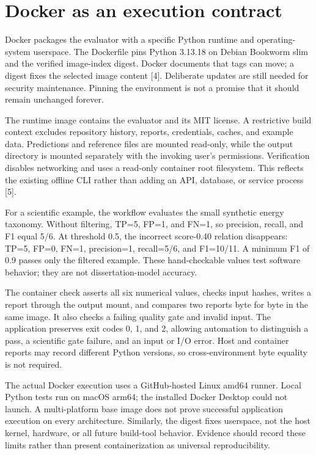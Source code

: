 \newpage
\section{Docker as an execution contract}
Docker packages the evaluator with a specific Python runtime and operating-system userspace. The Dockerfile pins Python 3.13.18 on Debian Bookworm slim and the verified image-index digest. Docker documents that tags can move; a digest fixes the selected image content [4]. Deliberate updates are still needed for security maintenance. Pinning the environment is not a promise that it should remain unchanged forever.

The runtime image contains the evaluator and its MIT license. A restrictive build context excludes repository history, reports, credentials, caches, and example data. Predictions and reference files are mounted read-only, while the output directory is mounted separately with the invoking user's permissions. Verification disables networking and uses a read-only container root filesystem. This reflects the existing offline CLI rather than adding an API, database, or service process [5].

For a scientific example, the workflow evaluates the small synthetic energy taxonomy. Without filtering, TP=5, FP=1, and FN=1, so precision, recall, and F1 equal 5/6. At threshold 0.5, the incorrect score-0.40 relation disappears: TP=5, FP=0, FN=1, precision=1, recall=5/6, and F1=10/11. A minimum F1 of 0.9 passes only the filtered example. These hand-checkable values test software behavior; they are not dissertation-model accuracy.

The container check asserts all six numerical values, checks input hashes, writes a report through the output mount, and compares two reports byte for byte in the same image. It also checks a failing quality gate and invalid input. The application preserves exit codes 0, 1, and 2, allowing automation to distinguish a pass, a scientific gate failure, and an input or I/O error. Host and container reports may record different Python versions, so cross-environment byte equality is not required.

The actual Docker execution uses a GitHub-hosted Linux amd64 runner. Local Python tests run on macOS arm64; the installed Docker Desktop could not launch. A multi-platform base image does not prove successful application execution on every architecture. Similarly, the digest fixes userspace, not the host kernel, hardware, or all future build-tool behavior. Evidence should record these limits rather than present containerization as universal reproducibility.

